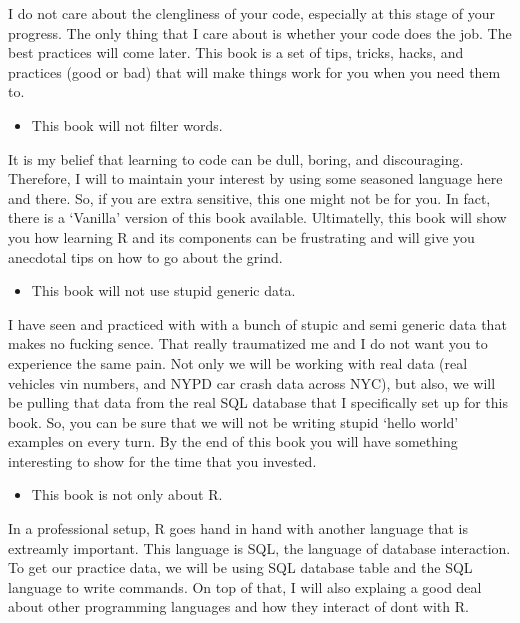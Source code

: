 \documentclass[]{book}
\providecommand{\tightlist}{%
  \setlength{\itemsep}{0pt}\setlength{\parskip}{0pt}}
\begin{document}
I do not care about the clengliness of your code, especially at this stage of your progress. The only thing that I care about is whether your code does the job. The best practices will come later. This book is a set of tips, tricks, hacks, and practices (good or bad) that will make things work for you when you need them to.

\begin{itemize}
\tightlist
\item
  This book will not filter words.
\end{itemize}

It is my belief that learning to code can be dull, boring, and discouraging. Therefore, I will to maintain your interest by using some seasoned language here and there. So, if you are extra sensitive, this one might not be for you. In fact, there is a `Vanilla' version of this book available. Ultimatelly, this book will show you how learning R and its components can be frustrating and will give you anecdotal tips on how to go about the grind.

\begin{itemize}
\tightlist
\item
  This book will not use stupid generic data.
\end{itemize}

I have seen and practiced with with a bunch of stupic and semi generic data that makes no fucking sence. That really traumatized me and I do not want you to experience the same pain. Not only we will be working with real data (real vehicles vin numbers, and NYPD car crash data across NYC), but also, we will be pulling that data from the real SQL database that I specifically set up for this book. So, you can be sure that we will not be writing stupid `hello world' examples on every turn. By the end of this book you will have something interesting to show for the time that you invested.

\begin{itemize}
\tightlist
\item
  This book is not only about R.
\end{itemize}

In a professional setup, R goes hand in hand with another language that is extreamly important. This language is SQL, the language of database interaction. To get our practice data, we will be using SQL database table and the SQL language to write commands. On top of that, I will also explaing a good deal about other programming languages and how they interact of dont with R.
\end{document}
